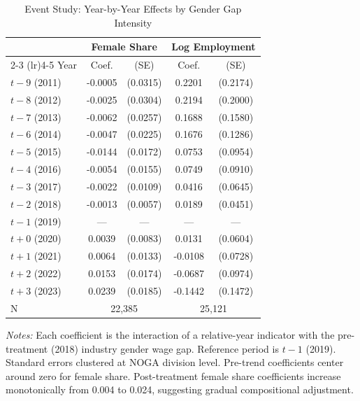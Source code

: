 \begin{table}[!htbp]
\centering
\caption{Event Study: Year-by-Year Effects by Gender Gap Intensity}
\label{tab:event}
\begin{tabular}{lcccc}
\hline\hline
 & \multicolumn{2}{c}{Female Share} & \multicolumn{2}{c}{Log Employment} \\
\cmidrule(lr){2-3} \cmidrule(lr){4-5}
Year & Coef. & (SE) & Coef. & (SE) \\
\hline
$t-9$ (2011) & -0.0005 & (0.0315) & 0.2201 & (0.2174) \\
$t-8$ (2012) & -0.0025 & (0.0304) & 0.2194 & (0.2000) \\
$t-7$ (2013) & -0.0062 & (0.0257) & 0.1688 & (0.1580) \\
$t-6$ (2014) & -0.0047 & (0.0225) & 0.1676 & (0.1286) \\
$t-5$ (2015) & -0.0144 & (0.0172) & 0.0753 & (0.0954) \\
$t-4$ (2016) & -0.0054 & (0.0155) & 0.0749 & (0.0910) \\
$t-3$ (2017) & -0.0022 & (0.0109) & 0.0416 & (0.0645) \\
$t-2$ (2018) & -0.0013 & (0.0057) & 0.0189 & (0.0451) \\
$t-1$ (2019) & --- & --- & --- & --- \\
$t+0$ (2020) & 0.0039 & (0.0083) & 0.0131 & (0.0604) \\
$t+1$ (2021) & 0.0064 & (0.0133) & -0.0108 & (0.0728) \\
$t+2$ (2022) & 0.0153 & (0.0174) & -0.0687 & (0.0974) \\
$t+3$ (2023) & 0.0239 & (0.0185) & -0.1442 & (0.1472) \\
\hline
N & \multicolumn{2}{c}{22,385} & \multicolumn{2}{c}{25,121} \\
\hline\hline
\end{tabular}
\vspace{0.2cm}
\parbox{0.9\textwidth}{\footnotesize \textit{Notes:} Each coefficient is the interaction of a relative-year indicator with the pre-treatment (2018) industry gender wage gap. Reference period is $t-1$ (2019). Standard errors clustered at NOGA division level. Pre-trend coefficients center around zero for female share. Post-treatment female share coefficients increase monotonically from 0.004 to 0.024, suggesting gradual compositional adjustment.}
\end{table}
